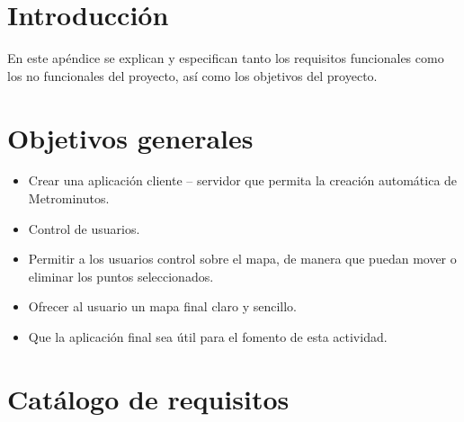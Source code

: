 
\section{Introducción}
En este apéndice se explican y especifican tanto los requisitos funcionales como los no funcionales del proyecto, así como los objetivos del proyecto.

\section{Objetivos generales}

\begin{itemize}
	\item Crear una aplicación cliente -- servidor que permita la creación automática de Metrominutos.
    \item Control de usuarios.
    \item Permitir a los usuarios control sobre el mapa, de manera que puedan mover o eliminar los puntos seleccionados.
    \item Ofrecer al usuario un mapa final claro y sencillo.
    \item Que la aplicación final sea útil para el fomento de esta actividad.
\end{itemize}

\section{Catálogo de requisitos}

